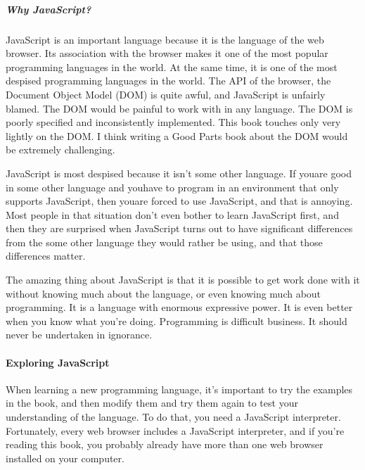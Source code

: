 \subparagraph*{Why JavaScript?}
\hfill \break
JavaScript is an important language because it is the language of the web browser. Its
association with the browser makes it one of the most popular programming languages
in the world. At the same time, it is one of the most despised programming
languages in the world. The API of the browser, the Document Object Model
(DOM) is quite awful, and JavaScript is unfairly blamed. The DOM would be painful
to work with in any language. The DOM is poorly specified and inconsistently
implemented. This book touches only very lightly on the DOM. I think writing a
Good Parts book about the DOM would be extremely challenging.\cite{20}


JavaScript is most despised because it isn’t some other language. If youare good in
some other language and youhave to program in an environment that only supports
JavaScript, then youare forced to use JavaScript, and that is annoying. Most people
in that situation don’t even bother to learn JavaScript first, and then they are surprised
when JavaScript turns out to have significant differences from the some other
language they would rather be using, and that those differences matter.\cite{20}


The amazing thing about JavaScript is that it is possible to get work done with it
without knowing much about the language, or even knowing much about programming.
It is a language with enormous expressive power. It is even better when you
know what you’re doing. Programming is difficult business. It should never be
undertaken in ignorance.\cite{20}

\paragraph*{Exploring JavaScript}
\hfill \break
When learning a new programming language, it’s important to try the examples in the
book, and then modify them and try them again to test your understanding of the
language. To do that, you need a JavaScript interpreter. Fortunately, every web browser
includes a JavaScript interpreter, and if you’re reading this book, you probably already
have more than one web browser installed on your computer.\cite{20}


